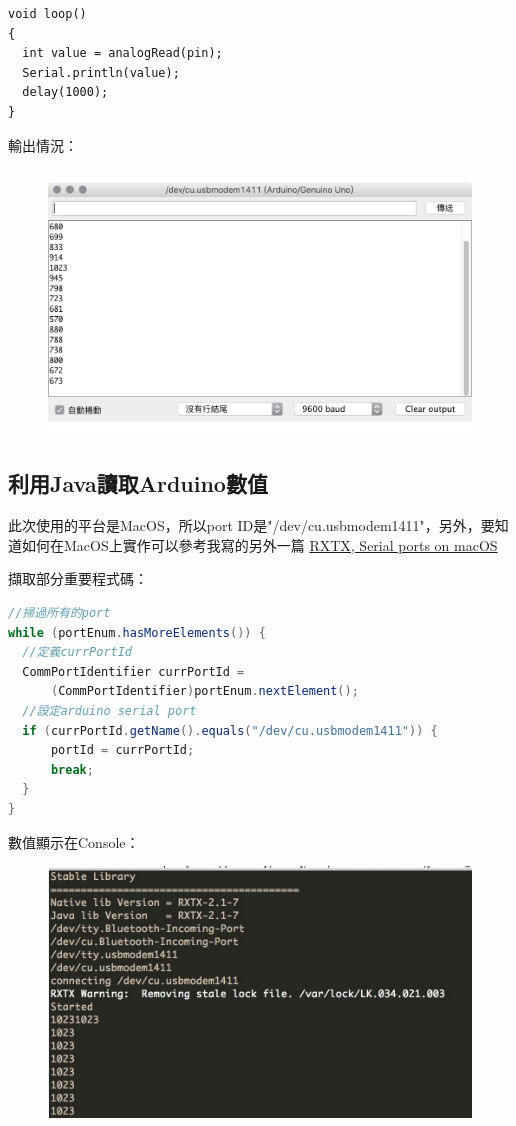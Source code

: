 \documentclass[12pt,a4paper]{article}
\begin{document}
{\begin{shaded}
\begin{lstlisting}[language=Arduino]
void loop()
{
  int value = analogRead(pin);
  Serial.println(value);
  delay(1000);
}
\end{lstlisting}
\end{shaded}

輸出情況：
\begin{figure}[ht]
\centering
\includegraphics[width=1.0\textwidth]{image/arduino_output.jpg}
\end{figure}

\subsection{利用Java讀取Arduino數值}

此次使用的平台是MacOS，所以port ID是"/dev/cu.usbmodem1411"，另外，要知道如何在MacOS上實作可以參考我寫的另外一篇
\href{https://medium.com/@willywu/rxtx-serial-ports-on-macos-8e99b3c7a001}{RXTX, Serial ports on macOS}

擷取部分重要程式碼：
\begin{shaded}
\begin{lstlisting}[language=Java]
//掃過所有的port
while (portEnum.hasMoreElements()) {
  //定義currPortId
  CommPortIdentifier currPortId = 
	  (CommPortIdentifier)portEnum.nextElement();
  //設定arduino serial port
  if (currPortId.getName().equals("/dev/cu.usbmodem1411")) {
	  portId = currPortId;
	  break;
  }
}
\end{lstlisting}
\end{shaded}

數值顯示在Console：
\begin{figure}[ht]
\centering
\includegraphics[width=1.0\textwidth]{image/console.jpg}
\end{figure}
}
\end{document}
